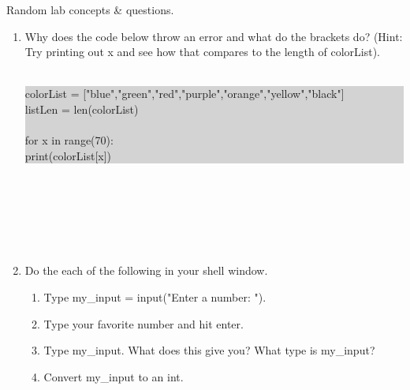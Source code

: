 \documentclass[11pt, letterpaper, onecolumn, oneside, final]{article}
\begin{document}
\maketitle

 Random lab concepts \& questions.
\begin{enumerate}
\item Why does the code  below throw an error and what do the brackets do? (Hint: Try printing out {\consolas x} and see how that compares to the length of {\consolas colorList}).\\\\
    \colorbox{lightgray}{\parbox{.88\textwidth}{\consolas colorList = ["blue","green","red","purple","orange","yellow","black"]\\
    listLen = len(colorList)\\
    \\
   for x in range(70):\\
   \hspace*{6mm} print(colorList[x])}}\\\\\\\\\\


\item Do the each of the following in your shell window.
\begin{enumerate}
\item Type {\consolas my\_input = input("Enter a number: ")}.
\item Type your favorite number and hit enter.
\item Type {\consolas my\_input}. What does this give you? What type is {\consolas my\_input}?
\item Convert {\consolas my\_input} to an {\consolas int}.
\end{enumerate}


\end{enumerate}
\end{document}
